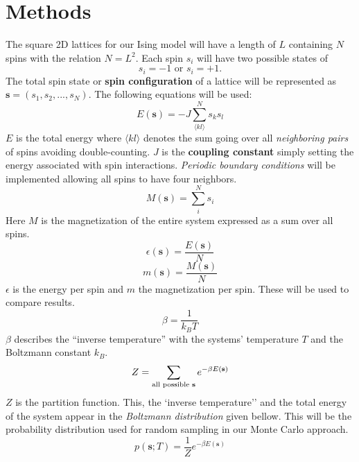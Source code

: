 \documentclass[english,notitlepage,reprint,nofootinbib]{revtex4-1}  %
\begin{document}
\section{Methods}\label{sec:methods}
The square 2D lattices for our Ising model will have a length of $L$ containing $N$ spins with the relation $N = L^2$. Each spin $s_i$ will have two possible states of 
\begin{equation}
    s_i = -1 \text{ or } s_i = +1.
\end{equation}
The total spin state or \textbf{spin configuration} of a lattice will be represented as $\textbf{s} = (s_1, s_2, ..., s_N)$. The following equations will be used:
\begin{equation}
    E(\textbf{s}) = - J \sum^N_{\langle kl \rangle} s_k s_l
\end{equation}
$E$ is the total energy where $\langle kl \rangle$ denotes the sum going over all \textit{neighboring pairs} of spins avoiding double-counting. $J$ is the \textbf{coupling constant} simply setting the energy associated with spin interactions. \textit{Periodic boundary conditions} will be implemented allowing all spins to have four neighbors.
\begin{equation}
    M(\textbf{s}) = \sum^N_i s_i
\end{equation}
Here $M$ is the magnetization of the entire system expressed as a sum over all spins.
\begin{equation}
    \epsilon(\textbf{s}) = \frac{E(\textbf{s})}{N}
\end{equation}
\begin{equation}
    m(\textbf{s}) = \frac{M(\textbf{s})}{N}
\end{equation}
$\epsilon$ is the energy per spin and $m$ the magnetization per spin. These will be used to compare results.
\begin{equation}
    \beta = \frac{1}{k_B T}
\end{equation}
$\beta$ describes the ``inverse temperature'' with the systems' temperature $T$ and the Boltzmann constant $k_B$.
\begin{equation}
    Z = \sum_{\text{all possible \textbf{s}}} e^{- \beta E(\textbf{s})}
\end{equation}
$Z$ is the partition function. This, the `inverse temperature'' and the total energy of the system appear in the \textit{Boltzmann distribution} given bellow. This will be the probability distribution used for random sampling in our Monte Carlo approach. 
\begin{equation}
    p(\textbf{s};T) = \frac{1}{Z} e^{-\beta E(\textbf{s})} \label{eq:prob_dist}
\end{equation} 
\end{document}
